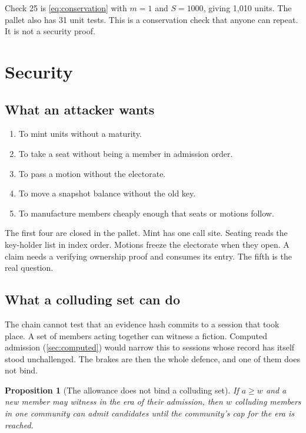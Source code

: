 \documentclass[11pt,a4paper]{article}
\theoremstyle{definition}
\theoremstyle{plain}
\newtheorem{proposition}{Proposition}[section]
\theoremstyle{remark}
\begin{document}
Check 25 is \cref{eq:conservation} with $m = 1$ and $S = 1000$, giving 1,010 units. The pallet also has 31 unit tests. This is a conservation check that anyone can repeat. It is not a security proof.

\section{Security}
\label{sec:security}

\subsection{What an attacker wants}

\begin{enumerate}
  \item To mint units without a maturity.
  \item To take a seat without being a member in admission order.
  \item To pass a motion without the electorate.
  \item To move a snapshot balance without the old key.
  \item To manufacture members cheaply enough that seats or motions follow.
\end{enumerate}

The first four are closed in the pallet. Mint has one call site. Seating reads the key-holder list in index order. Motions freeze the electorate when they open. A claim needs a verifying ownership proof and consumes its entry. The fifth is the real question.

\subsection{What a colluding set can do}

The chain cannot test that an evidence hash commits to a session that took place. A set of members acting together can witness a fiction. Computed admission (\cref{sec:computed}) would narrow this to sessions whose record has itself stood unchallenged. The brakes are then the whole defence, and one of them does not bind.

\begin{proposition}[The allowance does not bind a colluding set]
If $a \ge w$ and a new member may witness in the era of their admission, then $w$ colluding members in one community can admit candidates until the community's cap for the era is reached.
\end{proposition}
\end{document}
